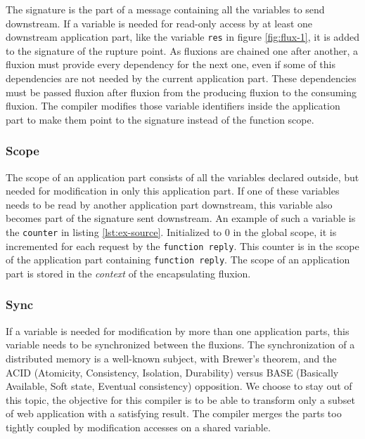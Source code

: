 The signature is the part of a message containing all the variables to send downstream.
If a variable is needed for read-only access by at least one downstream application part, like the variable \texttt{res} in figure \ref{fig:flux-1}, it is added to the signature of the rupture point.
As fluxions are chained one after another, a fluxion must provide every dependency for the next one, even if some of this dependencies are not needed by the current application part.
These dependencies must be passed fluxion after fluxion from the producing fluxion to the consuming fluxion.
The compiler modifies those variable identifiers inside the application part to make them point to the signature instead of the function scope.

\subsubsection{Scope}

The scope of an application part consists of all the variables declared outside, but needed for modification in only this application part.
If one of these variables needs to be read by another application part downstream, this variable also becomes part of the signature sent downstream.
An example of such a variable is the \texttt{counter} in listing \ref{lst:ex-source}.
Initialized to 0 in the global scope, it is incremented for each request by the \texttt{function reply}.
This counter is in the scope of the application part containing \texttt{function reply}.
The scope of an application part is stored in the \textit{context} of the encapsulating fluxion.

\subsubsection{Sync}

If a variable is needed for modification by more than one application parts, this variable needs to be synchronized between the fluxions.
The synchronization of a distributed memory is a well-known subject, with Brewer's theorem\cite{Gilbert2002}\cite{codahale2010}, and the ACID (Atomicity, Consistency, Isolation, Durability) versus BASE (Basically Available, Soft state, Eventual consistency) opposition\cite{Fox1997}.
We choose to stay out of this topic, the objective for this compiler is to be able to transform only a subset of web application with a satisfying result.
The compiler merges the parts too tightly coupled by modification accesses on a shared variable.

